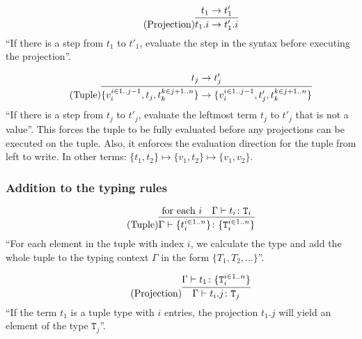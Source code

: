 \begin{equation*}
    \tag{Projection}
    \infer{
        t_1 . i \rightarrow t'_1 . i
    }{
        t_1 \rightarrow t'_1
    }
\end{equation*}
``If there is a step from $t_1$ to $t'_1$, evaluate the step
in the syntax before executing the projection''.

\begin{equation*}
    \tag{Tuple}
    \infer{
    \{v_i^{i \in 1..j-1}, t_j, t_k^{k \in j+1..n}\} \rightarrow \{v_i^{i \in 1..j-1}, t'_j, t_k^{k \in j+1..n}\}
    }{
    t_j \rightarrow t'_j
    }
\end{equation*}
``If there is a step from $t_j$ to $t'_j$, evaluate the leftmost
term $t_j$ to $t'_j$ that is not a value''. This forces the tuple to
be fully evaluated before any projections can be executed on the tuple.
Also, it enforces the evaluation direction for the tuple from left to write.
In other terms: $\{t_1, t_2\} \mapsto \{v_1, t_2\} \mapsto \{v_1, v_2\}$.

\subsubsection{Addition to the typing rules \cite{pierce2002ProgLang}}
\begin{equation*}
    \tag{Tuple}
    \infer{
    \Gamma \vdash \{t_i^{i \in 1..n}\} \colon \{\texttt{T}_i^{i \in 1..n}\}
    }{
    \text{for each } i & \Gamma \vdash t_i \colon \texttt{T}_i
    }
\end{equation*}
``For each element in the tuple with index $i$, we calculate the type
and add the whole tuple to the typing context $\Gamma$ in the form $\{T_1, T_2, \dots\}$''.

\begin{equation*}
    \tag{Projection}
    \infer{
    \Gamma \vdash t_i . j \colon \texttt{T}_j
    }{
    \Gamma \vdash t_1 \colon \{\texttt{T}_i^{i \in 1..n}\}
    }
\end{equation*}
``If the term $t_1$ is a tuple type with $i$ entries, the projection
$t_1 . j$ will yield an element of the type $\texttt{T}_j$''.
